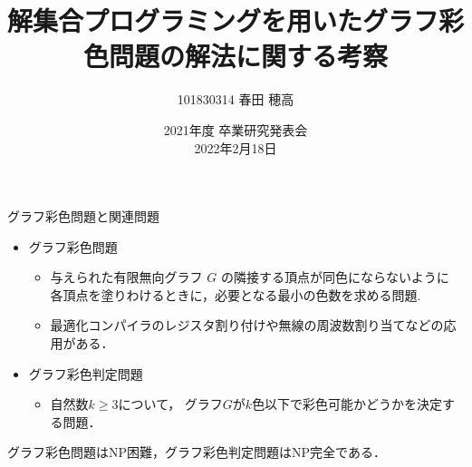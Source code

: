 \documentclass[dvipdfmx,11pt]{beamer}
\title{解集合プログラミングを用いたグラフ彩色問題の解法に関する考察}
\author{101830314 春田 穂高}
\institute{番原研究室}
\date{2021年度 卒業研究発表会\\2022年2月18日}
\begin{document}
\frame{\maketitle}
\begin{frame}{グラフ彩色問題と関連問題}
 \begin{itemize}
  \item \alert{グラフ彩色問題}
        \begin{itemize}
	 \item 与えられた有限無向グラフ $G$ の隣接する頂点が同色にならないように
	       各頂点を塗りわけるときに，必要となる最小の色数を求める問題.
	 \item 最適化コンパイラのレジスタ割り付けや無線の周波数割り当てなどの応用がある．
        \end{itemize}
  \item \alert{グラフ彩色判定問題}
        \begin{itemize}
         \item 自然数$k\geq 3$について，
	       グラフ$G$が$k$色以下で彩色可能かどうかを決定する問題．
        \end{itemize}
 \end{itemize}

 \begin{alertblock}{}
  \centering
  グラフ彩色問題はNP困難，グラフ彩色判定問題はNP完全である．
 \end{alertblock}
\end{frame}
\end{document}
